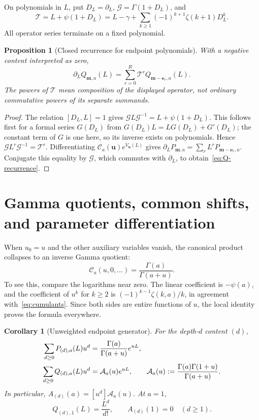 \documentclass[11pt,oneside]{article}
\numberwithin{equation}{section}
\newtheorem{proposition}[theorem]{Proposition}
\newtheorem{corollary}[theorem]{Corollary}
\theoremstyle{definition}
\theoremstyle{remark}
\newcommand{\uu}{\mathbf u}
\newcommand{\mm}{\mathbf m}
\newcommand{\ee}{\mathbf e}
\newcommand{\CC}{\mathcal C}
\newcommand{\Acal}{\mathcal A}
\newcommand{\Gop}{\mathcal G}
\newcommand{\Top}{\mathcal T}
\begin{document}
On polynomials in $L$, put $D_L=\partial_L$, $\Gop=\Gamma(1+D_L)$, and
\begin{equation}\label{eq:Top}
\Top=L+\psi(1+D_L)
=L-\gamma+\sum_{k\ge1}(-1)^{k+1}\zeta(k+1)D_L^k.
\end{equation}
All operator series terminate on a fixed polynomial.

\begin{proposition}[Closed recurrence for endpoint polynomials]
\label{prop:operator}
With a negative content interpreted as zero,
\begin{equation}\label{eq:Q-recurrence}
\partial_LQ_{\mm,a}(L)=\sum_{r=0}^R\Top^r Q_{\mm-\ee_r,a}(L).
\end{equation}
The powers of $\Top$ mean composition of the displayed operator, not ordinary
commutative powers of its separate summands.
\end{proposition}

\begin{proof}
The relation $[D_L,L]=1$ gives
$\Gop L\Gop^{-1}=L+\psi(1+D_L)$. This follows first for a formal series
$G(D_L)$ from $G(D_L)L=LG(D_L)+G'(D_L)$; the constant term of $G$ is one here,
so its inverse exists on polynomials. Hence
$\Gop L^r\Gop^{-1}=\Top^r$. Differentiating
$\CC_a(\uu)e^{V_{\uu}(L)}$ gives
$\partial_LP_{\mm,a}=\sum_r L^rP_{\mm-\ee_r,a}$. Conjugate this equality by
$\Gop$, which commutes with $\partial_L$, to obtain~\eqref{eq:Q-recurrence}.
\end{proof}

\section{Gamma quotients, common shifts, and parameter differentiation}
\label{sec:unweighted}

When $u_0=u$ and the other auxiliary variables vanish, the canonical product
collapses to an inverse Gamma quotient:
\begin{equation}\label{eq:Cunweighted}
\CC_a(u,0,\ldots)=\frac{\Gamma(a)}{\Gamma(a+u)}.
\end{equation}
To see this, compare the logarithms near zero. The linear coefficient is
$-\psi(a)$, and the coefficient of $u^k$ for $k\ge2$ is
$(-1)^{k-1}\zeta(k,a)/k$, in agreement with~\eqref{eq:cumulants}.
Since both sides are entire functions of $u$, the local identity proves the
formula everywhere.

\begin{corollary}[Unweighted endpoint generator]\label{cor:unweighted}
For the depth-$d$ content $(d)$,
\begin{align}
\sum_{d\ge0}P_{(d),a}(L)u^d
 &=\frac{\Gamma(a)}{\Gamma(a+u)}e^{uL},\notag\\
\sum_{d\ge0}Q_{(d),a}(L)u^d
 &=\Acal_a(u)e^{uL},\qquad
\Acal_a(u):=\frac{\Gamma(a)\Gamma(1+u)}{\Gamma(a+u)}.
\label{eq:Aunweighted}
\end{align}
In particular, $A_{(d)}(a)=[u^d]\Acal_a(u)$. At $a=1$,
\begin{equation}\label{eq:aone}
Q_{(d),1}(L)=\frac{L^d}{d!},\qquad A_{(d)}(1)=0\quad(d\ge1).
\end{equation}
\end{corollary}
\end{document}
